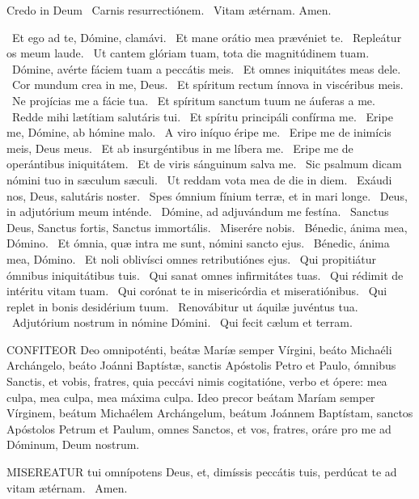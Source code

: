 Credo in Deum  \V\ Carnis resurrectiónem. \R\ Vitam ætérnam. Amen.

\V\ Et ego ad te, Dómine, clamávi. \R\ Et mane orátio mea prævéniet te. \V\ Repleátur os meum laude. \R\ Ut cantem glóriam tuam, tota die magnitúdinem tuam. \V\ Dómine, avérte fáciem tuam a peccátis meis. \R\ Et omnes iniquitátes meas dele. \V\ Cor mundum crea in me, Deus. \R\ Et spíritum rectum ínnova in viscéribus meis. \V\ Ne projícias me a fácie tua. \R\ Et spíritum sanctum tuum ne áuferas a me. \V\ Redde mihi lætítiam salutáris tui. \R\ Et spíritu principáli confírma me. \V\ Eripe me, Dómine, ab hómine malo. \R\ A viro iníquo éripe me. \V\ Eripe me de inimícis meis, Deus meus. \R\ Et ab insurgéntibus in me líbera me. \V\ Eripe me de operántibus iniquitátem. \R\ Et de viris sánguinum salva me. \V\ Sic psalmum dicam nómini tuo in sæculum sæculi. \R\ Ut reddam vota mea de die in diem. \V\ Exáudi nos, Deus, salutáris noster. \R\ Spes ómnium fínium terræ, et in mari longe. \V\ Deus, in adjutórium meum inténde. \R\ Dómine, ad adjuvándum me festína. \V\ Sanctus Deus, Sanctus fortis, Sanctus immortális. \R\ Miserére nobis. \V\ Bénedic, ánima mea, Dómino. \R\ Et ómnia, quæ intra me sunt, nómini sancto ejus. \V\ Bénedic, ánima mea, Dómino. \R\ Et noli oblivísci omnes retributiónes ejus. \V\ Qui propitiátur ómnibus iniquitátibus tuis. \R\ Qui sanat omnes infirmitátes tuas. \V\ Qui rédimit de intéritu vitam tuam. \R\ Qui corónat te in misericórdia et miseratiónibus. \V\ Qui replet in bonis desidérium tuum. \R\ Renovábitur ut áquilæ juvéntus tua. \V\ Adjutórium nostrum in nómine Dómini. \R\ Qui fecit cælum et terram.


\lettrine[lines=2]{C}{ONFITEOR} Deo omnipoténti, beátæ Maríæ semper Vírgini, beáto Michaéli Archángelo, beáto Joánni Baptístæ, sanctis Apóstolis Petro et Paulo, ómnibus Sanctis, et vobis, fratres, quia peccávi nimis cogitatióne, verbo et ópere: mea culpa, mea culpa, mea máxima culpa. Ideo precor beátam Maríam semper Vírginem, beátum Michaélem Archángelum, beátum Joánnem Baptístam, sanctos Apóstolos Petrum et Paulum, omnes Sanctos, et vos, fratres, oráre pro me ad Dóminum, Deum nostrum.


\lettrine[lines=2]{M}{ISEREATUR} tui omnípotens Deus, et, dimíssis peccátis tuis, perdúcat te ad vitam ætérnam. \R\ Amen.


